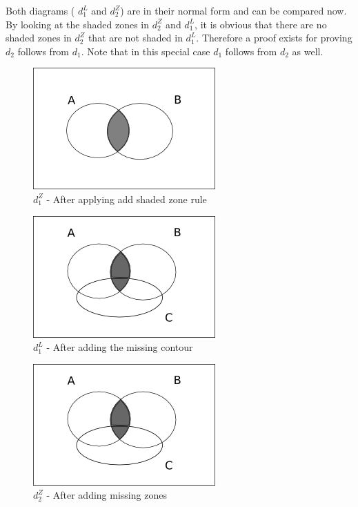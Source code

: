 \documentclass[10pt, a4paper, titlepage]{article}
\begin{document}
Both diagrams ( $ d^L_{1} $  and $ d^Z_{2} $) are in their normal form and can be compared now. By looking at the shaded zones in $ d^Z_{2} $ and $ d^L_{1} $, it is obvious that there are no shaded zones in $ d^Z_{2} $ that are not shaded in $ d^L_{1} $. Therefore a proof exists for proving $ d_{2} $ follows from $ d_{1} $. Note that in this special case $ d_{1} $ follows from $ d_{2} $ as well.

\begin{figure}[h]
\centering
\includegraphics[scale=0.7]{images/d11-1.png}
\caption{$ d^Z_{1} $ - After applying add shaded zone rule}
\label{d11-1}
\end{figure}


\begin{figure}[h]
\centering
\includegraphics[scale=0.7]{images/d11-2.png}
\caption{ $ d^L_{1} $ - After adding the missing contour}
\label{d11-2}
\end{figure}


\begin{figure}[h]
\centering
\includegraphics[scale=0.7]{images/d12-1.png}
\caption{ $ d^Z_{2} $ - After adding missing zones}
\label{d12-1}
\end{figure}
\end{document}

